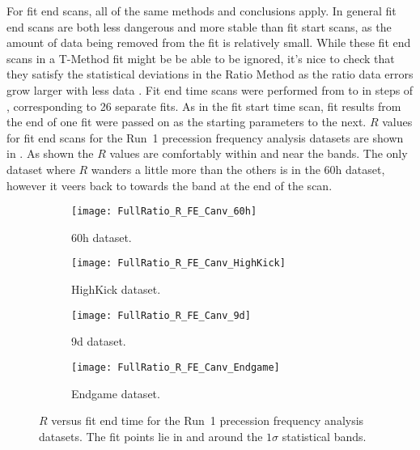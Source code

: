 For fit end scans, all of the same methods and conclusions apply. In general fit end scans are both less dangerous and more stable than fit start scans, as the amount of data being removed from the fit is relatively small. While these fit end scans in a T-Method fit might be be able to be ignored, it's nice to check that they satisfy the statistical deviations in the Ratio Method as the ratio data errors grow larger with less data \cite{BU60hReport}. Fit end time scans were performed from  to  in steps of , corresponding to 26 separate fits. As in the fit start time scan, fit results from the end of one fit were passed on as the starting parameters to the next. $R$ values for fit end scans for the Run~1 precession frequency analysis datasets are shown in . As shown the $R$ values are comfortably within and near the bands. The only dataset where $R$ wanders a little more than the others is in the 60h dataset, however it veers back to towards the band at the end of the scan.


\begin{figure}[]
\centering
    \begin{subfigure}[]{0.45\textwidth}
        \centering
        \texttt{[image: FullRatio\_R\_FE\_Canv\_60h]}
        \caption{60h dataset.}
    \end{subfigure}%
    \begin{subfigure}[]{0.45\textwidth}
        \centering
        \texttt{[image: FullRatio\_R\_FE\_Canv\_HighKick]}
        \caption{HighKick dataset.}
    \end{subfigure}

    \begin{subfigure}[]{0.45\textwidth}
        \centering
        \texttt{[image: FullRatio\_R\_FE\_Canv\_9d]}
        \caption{9d dataset.}
    \end{subfigure}%
    \begin{subfigure}[]{0.45\textwidth}
        \centering
        \texttt{[image: FullRatio\_R\_FE\_Canv\_Endgame]}
        \caption{Endgame dataset.}
    \end{subfigure}
\caption[$R$ versus fit end time]{$R$ versus fit end time for the Run~1 precession frequency analysis datasets. The fit points lie in and around the $1\sigma$ statistical bands.}
\label{fig:fitEndTime_R}
\end{figure}


